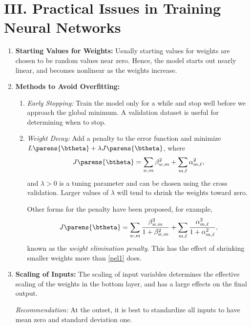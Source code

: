 \documentclass[12pt]{article}
\begin{document}
\section*{III. Practical Issues in Training Neural Networks}

\begin{enumerate}[label=\textbf{\arabic*.}]

	\item \textbf{Starting Values for Weights:} Usually starting values for weights are chosen to be random values near zero. Hence, the model starts out nearly linear, and becomes nonlinear as the weights increase. 
	
	\item \textbf{Methods to Avoid Overfitting:} 
	\begin{enumerate}
		\item \textit{Early Stopping:} Train the model only for a while and stop well before we approach the global minimum. A validation dataset is useful for determining when to stop. 
		\item \textit{Weight Decay:} Add a penalty to the error function and minimize $L \parens{\btheta} + \lambda J \parens{\btheta}$, where 
		\begin{align}\label{pel1}
			J \parens{\btheta} = \sum_{w,m} \beta_{w,m}^2 + \sum_{m,\ell} \alpha_{m,\ell}^2, 
		\end{align}
		and $\lambda > 0$ is a tuning parameter and can be chosen using the cross validation. Larger values of $\lambda$ will tend to shrink the weights toward zero. 
		
		Other forms for the penalty have been proposed, for example,
		\begin{align}
			J \parens{\btheta} = \sum_{w,m} \frac{\beta_{w,m}^2}{1 + \beta_{w,m}^2} + \sum_{m,\ell} \frac{\alpha_{m,\ell}^2}{1 + \alpha_{m,\ell}^2}, 
		\end{align}
		known as the \textit{weight elimination penalty}. This has the effect of shrinking smaller weights more than \eqref{pel1} does. 
	\end{enumerate}
	
	\item \textbf{Scaling of Inputs:} The scaling of input variables determines the effective scaling of the weights in the bottom layer, and has a large effects on the final output. 
	
	\textit{Recommendation:} At the outset, it is best to standardize all inputs to have mean zero and standard deviation one. 
	

\end{enumerate}
\end{document}
